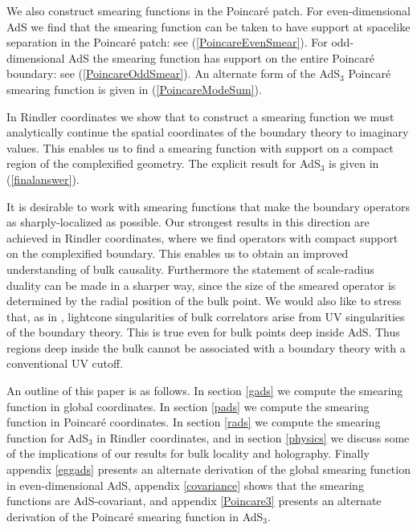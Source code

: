 \documentclass[12pt]{article}
\begin{document}
We also construct smearing functions in the Poincar\'e patch.  For
even-dimensional AdS we find that the smearing function can be taken
to have support at spacelike separation in the Poincar\'e patch: see
(\ref{PoincareEvenSmear}).  For odd-dimensional AdS the smearing
function has support on the entire Poincar\'e boundary: see
(\ref{PoincareOddSmear}).  An alternate form of the AdS${}_3$
Poincar\'e smearing function is given in (\ref{PoincareModeSum}).

In Rindler coordinates we show that to construct a smearing function
we must analytically continue the spatial coordinates of the boundary
theory to imaginary values.  This enables us to find a smearing
function with support on a compact region of the complexified
geometry.  The explicit result for AdS${}_3$ is given in
(\ref{finalanswer}).

It is desirable to work with smearing functions that make the boundary
operators as sharply-localized as possible.  Our strongest results in
this direction are achieved in Rindler coordinates, where we find
operators with compact support on the complexified boundary.  This
enables us to obtain an improved understanding of bulk causality.
Furthermore the statement of scale-radius duality
\cite{Susskind:1998dq,Peet:1998wn} can be made in a sharper way, since
the size of the smeared operator is determined by the radial position
of the bulk point. We would also like to stress that, as in
\cite{hkll}, lightcone singularities of bulk correlators arise from UV
singularities of the boundary theory.  This is true even for bulk
points deep inside AdS.  Thus regions deep inside the bulk cannot be
associated with a boundary theory with a conventional UV cutoff.

An outline of this paper is as follows.  In section \ref{gads} we
compute the smearing function in global coordinates.  In section
\ref{pads} we compute the smearing function in Poincar\'e coordinates.
In section \ref{rads} we compute the smearing function for AdS${}_3$
in Rindler coordinates, and in section \ref{physics} we discuss some
of the implications of our results for bulk locality and holography.
Finally appendix \ref{eggads} presents an alternate derivation of the
global smearing function in even-dimensional AdS, appendix
\ref{covariance} shows that the smearing functions are AdS-covariant,
and appendix \ref{Poincare3} presents an alternate derivation of the
Poincar\'e smearing function in AdS${}_3$.

\end{document}
